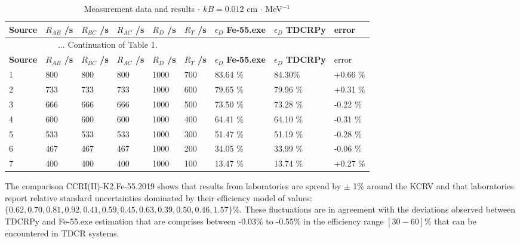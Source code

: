 \documentclass[12pt]{iopart}
\begin{document}
\begingroup
\footnotesize
\begin{longtable}[l]{| p{} | p{} | p{} | p{} | p{} | p{} |p{} |p{} |p{} |} 
\caption{Measurement data and results - $kB = 0.012$ cm $\cdot$ MeV$^{-1}$}
\label{Table1} \\ 
\hline
\textbf{Source} & \textbf{$R_{AB}$ /s} & \textbf{$R_{BC}$ /s} & \textbf{$R_{AC}$ /s} & \textbf{$R_{D}$ /s} & \textbf{$R_{T}$ /s} & \textbf{$\epsilon_{D}$ Fe-55.exe} & \textbf{$\epsilon_{D}$ TDCRPy} & error \\ 
\endfirsthead
\multicolumn{6}{c}{... Continuation of Table 1.}\\ 
\hline
 \textbf{Source} & \textbf{$R_{AB}$ /s} & \textbf{$R_{BC}$ /s} & \textbf{$R_{AC}$ /s} & \textbf{$R_{D}$ /s} & \textbf{$R_{T}$ /s} & \textbf{$\epsilon_{D}$ Fe-55.exe} & \textbf{$\epsilon_{D}$ TDCRPy} & error \\   \hline 
\endhead
\hline
 1 & 800    & 800     & 800    & 1000    &  700   &  83.64 \% &  84.30\% & +0.66 \% \\
 2 & 733    & 733     & 733    & 1000    &  600   &  79.65 \% &  79.96 \% & +0.31 \% \\
 3 & 666    & 666     & 666    & 1000    &  500   &  73.50 \% &  73.28 \% & -0.22 \% \\
 4 & 600    & 600     & 600    & 1000    &  400   &  64.41 \% &  64.10 \% &  -0.31 \% \\
 5 & 533    & 533     & 533    & 1000    &  300   &  51.47 \% &  51.19 \% &  -0.28 \% \\
 6 & 467    & 467     & 467    & 1000    &  200   &  34.05 \% &  33.99 \% &  -0.06 \% \\
 7 & 400    & 400     & 400    & 1000    &  100   &  13.47 \% &  13.74 \% &  +0.27 \% \\
\hline
\end{longtable} 
\endgroup

The comparison CCRI(II)-K2.Fe-55.2019 shows that results from laboratories are spread by $\pm$ 1\% around the KCRV and that laboratories report relative standard uncertainties dominated by their efficiency model of values: $\{0.62, 0.70, 0.81, 0.92, 0.41, 0.59, 0.45, 0.63, 0.39, 0.50, 0.46, 1.57\}$\%.
These fluctuations are in agreement with the deviations observed between TDCRPy and Fe-55.exe estimation that are comprises between -0.03\% to -0.55\% in the efficiency range $[30-60]$\% that can be encountered in TDCR systems.
\end{document}
